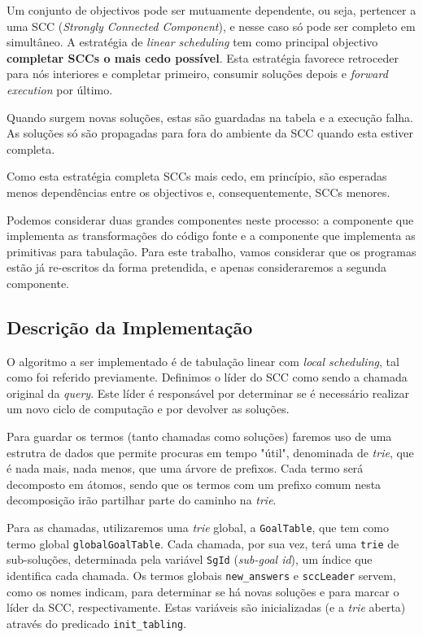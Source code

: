 \documentclass[12pt,a4paper,oneside]{article}
\begin{document}
Um conjunto de objectivos pode ser mutuamente dependente, ou seja, pertencer a uma SCC (\textit{Strongly Connected Component}), e nesse caso só pode ser completo em simultâneo. A estratégia de \textit{linear scheduling} tem como principal objectivo \textbf{completar SCCs o mais cedo possível}. Esta estratégia favorece retroceder para nós interiores e completar primeiro, consumir soluções depois e \textit{forward execution} por último.

Quando surgem novas soluções, estas são guardadas na tabela e a execução falha. As soluções só são propagadas para fora do ambiente da SCC quando esta estiver completa.

Como esta estratégia completa SCCs mais cedo, em princípio, são esperadas menos dependências entre os objectivos e, consequentemente, SCCs menores.

Podemos considerar duas grandes componentes neste processo: a componente que implementa as transformações do código fonte e a componente que implementa as primitivas para tabulação. Para este trabalho, vamos considerar que os programas estão já re-escritos da forma pretendida, e apenas consideraremos a segunda componente.

\subsection{Descrição da Implementação}\label{subsec:descrip}

O algoritmo a ser implementado é de tabulação linear com \textit{local scheduling}, tal como foi referido previamente. Definimos o líder do SCC como sendo a chamada original da \textit{query}. Este líder é responsável por determinar se é necessário realizar um novo ciclo de computação e por devolver as soluções.

Para guardar os termos (tanto chamadas como soluções) faremos uso de uma estrutra de dados que permite procuras em tempo "útil", denominada de \textit{trie}, que é nada mais, nada menos, que uma árvore de prefixos. Cada termo será decomposto em átomos, sendo que os termos com um prefixo comum nesta decomposição irão partilhar parte do caminho na \textit{trie}.

Para as chamadas, utilizaremos uma \textit{trie} global, a \texttt{GoalTable}, que tem como termo global \texttt{globalGoalTable}. Cada chamada, por sua vez, terá uma \texttt{trie} de sub-soluções, determinada pela variável \texttt{SgId} (\textit{sub-goal id}), um índice que identifica cada chamada. Os termos globais \texttt{new\_answers} e \texttt{sccLeader} servem, como os nomes indicam, para determinar se há novas soluções e para marcar o líder da SCC, respectivamente. Estas variáveis são inicializadas (e a \textit{trie} aberta) através do predicado \texttt{init\_tabling}.
\end{document}
